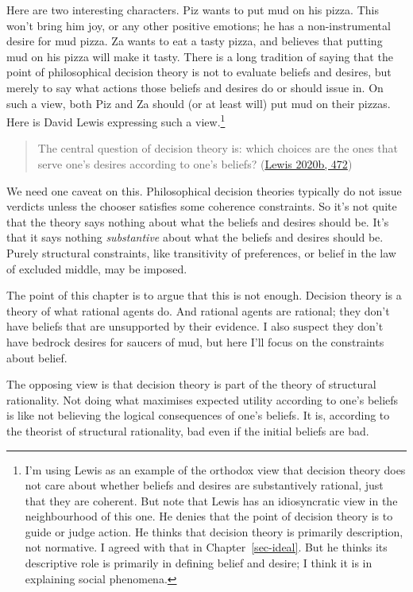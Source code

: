 \documentclass[
  12pt,
  letterpaper,
  DIV=11,
  numbers=noendperiod]{scrreprt}
\begin{document}
Here are two interesting characters. Piz wants to put mud on his pizza.
This won't bring him joy, or any other positive emotions; he has a
non-instrumental desire for mud pizza. Za wants to eat a tasty pizza,
and believes that putting mud on his pizza will make it tasty. There is
a long tradition of saying that the point of philosophical decision
theory is not to evaluate beliefs and desires, but merely to say what
actions those beliefs and desires do or should issue in. On such a view,
both Piz and Za should (or at least will) put mud on their pizzas. Here
is David Lewis expressing such a view.\footnote{I'm using Lewis as an
  example of the orthodox view that decision theory does not care about
  whether beliefs and desires are substantively rational, just that they
  are coherent. But note that Lewis has an idiosyncratic view in the
  neighbourhood of this one. He denies that the point of decision theory
  is to guide or judge action. He thinks that decision theory is
  primarily description, not normative. I agreed with that in
  Chapter~\ref{sec-ideal}. But he thinks its descriptive role is
  primarily in defining belief and desire; I think it is in explaining
  social phenomena.}

\begin{quote}
The central question of decision theory is: which choices are the ones
that serve one's desires according to one's beliefs?
(\protect\hyperlink{ref-Lewis-Gorman-10071979}{Lewis 2020b, 472})
\end{quote}

We need one caveat on this. Philosophical decision theories typically do
not issue verdicts unless the chooser satisfies some coherence
constraints. So it's not quite that the theory says nothing about what
the beliefs and desires should be. It's that it says nothing
\emph{substantive} about what the beliefs and desires should be. Purely
structural constraints, like transitivity of preferences, or belief in
the law of excluded middle, may be imposed.

The point of this chapter is to argue that this is not enough. Decision
theory is a theory of what rational agents do. And rational agents are
rational; they don't have beliefs that are unsupported by their
evidence. I also suspect they don't have bedrock desires for saucers of
mud, but here I'll focus on the constraints about belief.

The opposing view is that decision theory is part of the theory of
structural rationality. Not doing what maximises expected utility
according to one's beliefs is like not believing the logical
consequences of one's beliefs. It is, according to the theorist of
structural rationality, bad even if the initial beliefs are bad.
\end{document}
